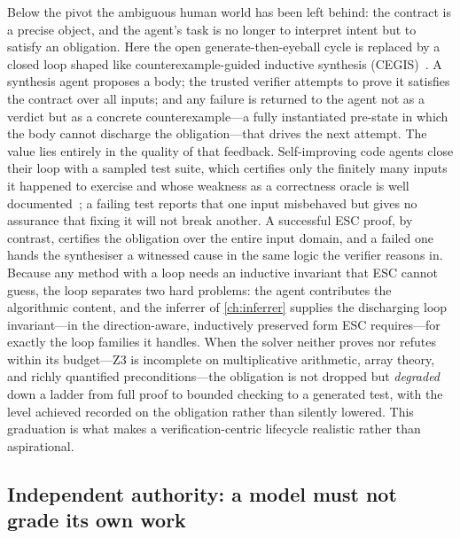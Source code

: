 Below the pivot the ambiguous human world has been left behind: the contract is a
precise object, and the agent's task is no longer to interpret intent but to
satisfy an obligation. Here the open generate-then-eyeball cycle is replaced by a
closed loop shaped like counterexample-guided inductive synthesis
(CEGIS)~\citep{solarlezama2006sketching,solarlezama2008sketching}. A synthesis
agent proposes a body; the trusted verifier attempts to prove it satisfies the
contract over all inputs; and any failure is returned to the agent not as a verdict
but as a concrete counterexample---a fully instantiated pre-state in which the body
cannot discharge the obligation---that drives the next attempt. The value lies
entirely in the quality of that feedback. Self-improving code agents close their
loop with a sampled test suite, which certifies only the finitely many inputs it
happened to exercise and whose weakness as a correctness oracle is well
documented~\citep{liu2023evalplus,chen2021codex}; a failing test reports that one
input misbehaved but gives no assurance that fixing it will not break another. A
successful ESC proof, by contrast, certifies the obligation over the entire input
domain, and a failed one hands the synthesiser a witnessed cause in the same logic
the verifier reasons in. Because any method with a loop needs an inductive
invariant that ESC cannot guess, the loop separates two hard problems: the agent
contributes the algorithmic content, and the inferrer of \cref{ch:inferrer}
supplies the discharging loop invariant---in the direction-aware, inductively
preserved form ESC requires---for exactly the loop families it handles. When the
solver neither proves nor refutes within its budget---Z3 is incomplete on
multiplicative arithmetic, array theory, and richly quantified preconditions---the
obligation is not dropped but \emph{degraded} down a ladder from full proof to
bounded checking to a generated test, with the level achieved recorded on the
obligation rather than silently lowered. This graduation is what makes a
verification-centric lifecycle realistic rather than aspirational.

\subsection{Independent authority: a model must not grade its own work}\label{sec:int-authority}

